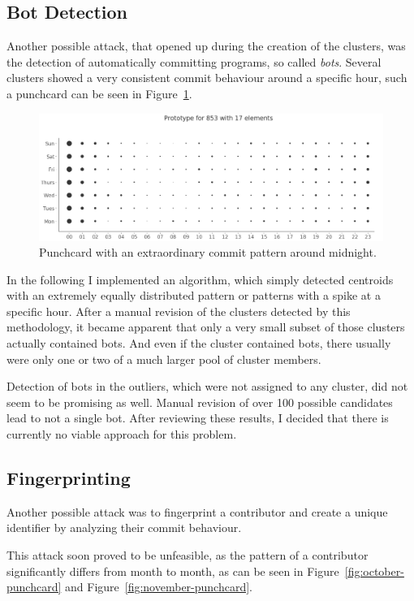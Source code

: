 \subsection{Bot Detection}
Another possible attack, that opened up during the creation of the clusters, was the detection of automatically committing programs, so called \emph{bots}.
Several clusters showed a very consistent commit behaviour around a specific hour, such a punchcard can be seen in Figure~\ref{fig:bot-punchcard}.

\begin{figure}[H]
    \includegraphics[scale=0.32]{./graphs/analysis/bot-punchcard}
    \centering
    \caption{Punchcard with an extraordinary commit pattern around midnight.}\label{fig:bot-punchcard}
\end{figure}

In the following I implemented an algorithm, which simply detected centroids with an extremely equally distributed pattern or patterns with a spike at a specific hour.
After a manual revision of the clusters detected by this methodology, it became apparent that only a very small subset of those clusters actually contained bots.
And even if the cluster contained bots, there usually were only one or two of a much larger pool of cluster members.

Detection of bots in the outliers, which were not assigned to any cluster, did not seem to be promising as well.
Manual revision of over 100 possible candidates lead to not a single bot.
After reviewing these results, I decided that there is currently no viable approach for this problem.


\subsection{Fingerprinting}
Another possible attack was to fingerprint a contributor and create a unique identifier by analyzing their commit behaviour.

This attack soon proved to be unfeasible, as the pattern of a contributor significantly differs from month to month, as can be seen in Figure~\ref{fig:october-punchcard} and Figure~\ref{fig:november-punchcard}.

